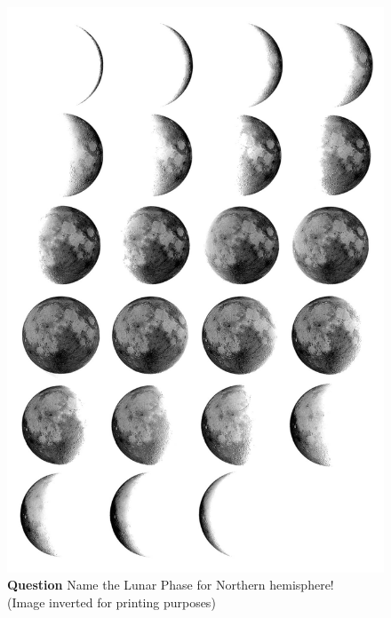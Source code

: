 \documentclass[a4paper,12pt]{extarticle}
\begin{document}
\begin{figure}[H]
	\centering
	\includegraphics[width=0.7\linewidth]{moon_phase.png}
	\caption*{\textsf{\textbf{Question}} Name the Lunar Phase for Northern hemisphere!\\ 
	(Image inverted for printing purposes)}
\end{figure}
\end{document}
